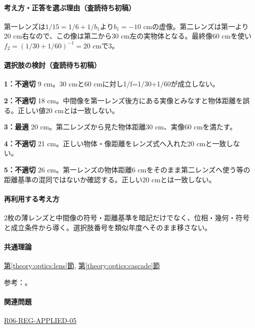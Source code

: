 \paragraph{考え方・正答を選ぶ理由（査読待ち初稿）} 第一レンズは\(1/15=1/6+1/b_1\)より\(b_1=-10\) cmの虚像。第二レンズは第一より20 cm右なので、この像は第二から30 cm左の実物体となる。最終像60 cmを使い\(f_2=(1/30+1/60)^{-1}=20\) cmで3。

\paragraph{選択肢の検討（査読待ち初稿）}\mbox{}\par

\noindent\textbf{1：不適切} 9 cm。30 cmと60 cmに対し1/f=\allowbreak{}1/30+1/60が成立しない。\par

\noindent\textbf{2：不適切} 18 cm。中間像を第一レンズ後方にある実像とみなすと物体距離を誤る。正しい値20 cmとは一致しない。\par

\noindent\textbf{3：最適} 20 cm。第二レンズから見た物体距離30 cm、実像60 cmを満たす。\par

\noindent\textbf{4：不適切} 21 cm。正しい物体・像距離をレンズ式へ入れた20 cmと一致しない。\par

\noindent\textbf{5：不適切} 26 cm。第一レンズの物体距離6 cmをそのまま第二レンズへ使う等の距離基準の混同ではないか確認する。正しい20 cmとは一致しない。\par

\paragraph{再利用する考え方} 2枚の薄レンズと中間像の符号・距離基準を暗記だけでなく、位相・幾何・符号と成立条件から導く。選択肢番号を類似年度へそのまま移さない。

\paragraph{共通理論} \hyperref[theory:optics:lens]{第\ref*{theory:optics:lens}節}, \hyperref[theory:optics:cascade]{第\ref*{theory:optics:cascade}節}

\par 参考：\cite{os_lens}。

\paragraph{関連問題} \hyperref[q:r06-reg-applied-05]{R06-REG-APPLIED-05}

